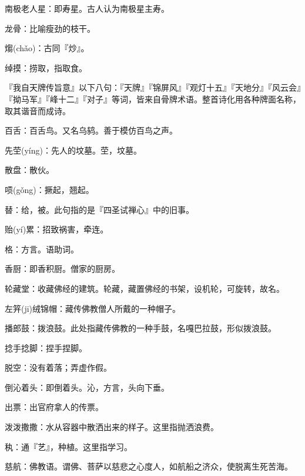 \startbuffer[2116]
南极老人星：即寿星。古人认为南极星主寿。
\stopbuffer


\startbuffer[2117]
龙骨：比喻瘦劲的枝干。
\stopbuffer


\startbuffer[2118]
煼(chǎo)：古同『炒』。
\stopbuffer


\startbuffer[2119]
绰摸：捞取，指取食。
\stopbuffer


\startbuffer[2120]
『我自天牌传旨意』以下八句：『天牌』『锦屏风』『观灯十五』『天地分』『风云会』『拗马军』『峰十二』『对子』等词，皆来自骨牌术语。整首诗化用各种牌面名称，取其谐音而成诗。
\stopbuffer


\startbuffer[2121]
百舌：百舌鸟。又名乌鸫。善于模仿百鸟之声。
\stopbuffer


\startbuffer[2122]
先茔(yíng)：先人的坟墓。茔，坟墓。
\stopbuffer


\startbuffer[2123]
散盘：散伙。
\stopbuffer


\startbuffer[2124]
唝(gǒng)：撅起，翘起。
\stopbuffer


\startbuffer[2125]
替：给，被。此句指的是『四圣试禅心』中的旧事。
\stopbuffer


\startbuffer[2126]
贻(yí)累：招致祸害，牵连。
\stopbuffer


\startbuffer[2127]
格：方言。语助词。
\stopbuffer


\startbuffer[2128]
香厨：即香积厨。僧家的厨房。
\stopbuffer


\startbuffer[2129]
轮藏堂：收藏佛经的建筑。轮藏，藏置佛经的书架，设机轮，可旋转，故名。
\stopbuffer


\startbuffer[2130]
左笄(jī)绒锦帽：藏传佛教僧人所戴的一种帽子。
\stopbuffer


\startbuffer[2131]
播郎鼓：拨浪鼓。此处指藏传佛教的一种手鼓，名嘎巴拉鼓，形似拨浪鼓。
\stopbuffer


\startbuffer[2132]
捻手捻脚：捏手捏脚。
\stopbuffer


\startbuffer[2133]
脱空：没有着落；弄虚作假。
\stopbuffer


\startbuffer[2134]
倒沁着头：即倒着头。沁，方言，头向下垂。
\stopbuffer


\startbuffer[2135]
出票：出官府拿人的传票。
\stopbuffer


\startbuffer[2136]
泼泼撒撒：水从容器中散洒出来的样子。这里指抛洒浪费。
\stopbuffer


\startbuffer[2137]
秇：通『艺』，种植。这里指学习。
\stopbuffer


\startbuffer[2138]
慈航：佛教语。谓佛、菩萨以慈悲之心度人，如航船之济众，使脱离生死苦海。
\stopbuffer



